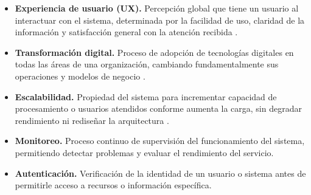 \begin{itemize}
	\item \textbf{Experiencia de usuario (UX).} Percepción global que tiene un usuario al interactuar con el sistema, determinada por la facilidad de uso, claridad de la información y satisfacción general con la atención recibida \parencite{google2021ux}.

    \item \textbf{Transformación digital.} Proceso de adopción de tecnologías digitales en todas las áreas de una organización, cambiando fundamentalmente sus operaciones y modelos de negocio \parencite{ocal2017}.

    \item \textbf{Escalabilidad.} Propiedad del sistema para incrementar capacidad de procesamiento o usuarios atendidos conforme aumenta la carga, sin degradar rendimiento ni rediseñar la arquitectura \parencite{aws2024scalability}.

    \item \textbf{Monitoreo.} Proceso continuo de supervisión del funcionamiento del sistema, permitiendo detectar problemas y evaluar el rendimiento del servicio.

    \item \textbf{Autenticación.} Verificación de la identidad de un usuario o sistema antes de permitirle acceso a recursos o información específica.
\end{itemize}
